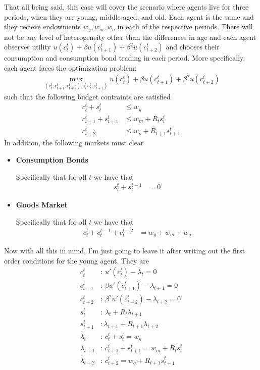 \documentclass[11pt,english]{article}
\begin{document}
\noindent That all being said, this case will cover the scenario where agents live for three periods, when they are young, middle aged, and old. Each agent is the same and they recieve endowments $w_y, w_m, w_o$ in each of the respective periods. There will not be any level of heterogeneity other than the differences in age and each agent observes utility $ u(c_t^t) + \beta u(c_{t+1}^t) + \beta^2u(c_{t+2}^t)$ and chooses their consumption and consumption bond trading in each period. More specifically, each agent faces the optimization problem:
\begin{align*}
	\max_{(c_t^t, c_{t+1}^t, c_{t+2}^t), (s_t^t, s_{t+1}^t)} u(c_t^t) + \beta u(c_{t+1}^t) + \beta^2 u(c_{t+2}^t)
\end{align*} such that the following budget contraints are satisfied
\begin{align*}
	c_t^t + s_t^t &\leq w_y\\
	c_{t+1}^t + s_{t+1}^t &\leq w_m + R_t s_t^t\\
	c_{t+2}^t &\leq w_o + R_{t+1}s_{t+1}^t
\end{align*} In addition, the following markets must clear \begin{itemize}
	\item \textbf{Consumption Bonds}
	
	Specifically that for all $t$ we have that \begin{align*}
		s_{t}^{t} + s_{t}^{t-1} &= 0 
	\end{align*}

	\item \textbf{Goods Market} 

	Specifically that for all $t$ we have that \begin{align*}
		c_{t}^{t} + c_{t}^{t-1} + c_{t}^{t-2} &= w_y + w_m + w_o
	\end{align*}
\end{itemize}
Now with all this in mind, I'm just going to leave it after writing out the first order conditions for the young agent. They are
\begin{align*}
	c_t^t &:\, u'(c_t^t) - \lambda_t = 0\\
	c_{t+1}^t &:\, \beta u'(c_{t+1}^t) - \lambda_{t+1} = 0 \\
	c_{t+2}^t &:\, \beta^2 u'(c_{t+2}^t) - \lambda_{t+2} = 0\\
	s_t^t &:\, \lambda_t + R_t\lambda_{t+1}\\
	s_{t+1}^t &:\lambda_{t+1} + R_{t+1}\lambda_{t+2} \\
	\lambda_{t} &:\, c_t^t + s_t^t = w_y\\
	\lambda_{t+1} &:\, c_{t+1}^t + s_{t+1}^t = w_m + R_ts_t^t\\
	\lambda_{t+2} &:\, c_{t+2}^t = w_o + R_{t+1}s_{t+1}^t 
\end{align*}
\end{document}
